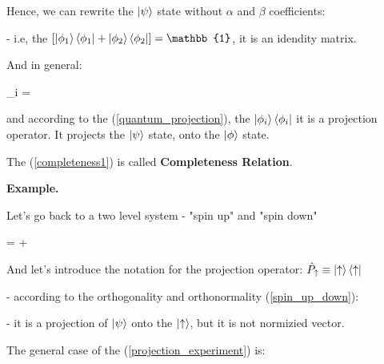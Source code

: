 \documentclass{article}
\begin{document}

Hence, we can rewrite the $\ket{\psi}$ state without $\alpha$ and $\beta$ coefficients:


- i.e, the $\left[ \ket{\phi_{1}}\bra{\phi_{1}} +   \ket{\phi_{2}}\bra{\phi_{2}} \right] = \mathbb{1}$, it is an idendity matrix.

And in general:

\beq \label{completeness1}
\sum_{i}  = 
\eeq

and according to the (\ref{quantum_projection}), the $\ket{\phi_{i}}\bra{\phi_{i}}$ it is a projection operator. It projects the $\ket{\psi}$ state, onto the $\ket{\phi}$ state.

The (\ref{completeness1}) is called \textbf{Completeness Relation}. 


\textbf{Example.}

Let's go back to a two level system - "spin up" and "spin down"

\beqn
\ket{\psi} = \ket{\uparrow} + \ket{\downarrow}
\eeq

And let's introduce the notation for the projection operator: $\hat{P}_{\uparrow} \equiv \ket{\uparrow}\bra{\uparrow}$

- according to the orthogonality and orthonormality (\ref{spin_up_down}):


- it is a projection of $\ket{\psi}$ onto the $\ket{\uparrow}$, but it is not normizied vector.

The general case of the (\ref{projection_experiment}) is: 

\end{document}

